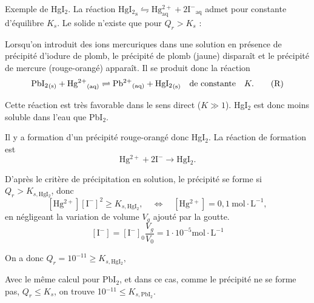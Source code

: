 \begin{solution}
\begin{questions}

\questioncours Exemple de HgI$_2$. La réaction $\mathrm{HgI_2}_\text{s} \leftrightharpoons \mathrm{Hg^{2+}_\text{aq} + 2 {I^-}_\text{aq}}$ admet pour constante d'équilibre $K_s$. Le solide n'existe que pour $Q_r > K_s$ :
    \begin{center}\end{center}

\question Lorsqu'on introduit des ions mercuriques dans une solution en présence de précipité d'iodure de plomb, le précipité de plomb (jaune) disparaît et le précipité de mercure (rouge-orangé) apparaît.
Il se produit donc la réaction
\begin{equation}
    \mathrm{{PbI_2}_\text{(s)} + {Hg^{2+}}_\text{(aq)} \rightleftharpoons {Pb^{2+}}_\text{(aq)} + {HgI_2}_\text{(s)}} \qqtext{de constante} K. \tag{R}
\end{equation}
    
Cette réaction est très favorable dans le sens direct ($K\gg 1$).
HgI$_2$ est donc moins soluble dans l'eau que PbI$_2$.


\question Il y a formation d'un précipité rouge-orangé donc HgI$_2$. La réaction de formation est
$$\mathrm{Hg^{2+} + 2I^- \rightarrow HgI_2}.$$

D'après le critère de précipitation en solution, le précipité se forme si $Q_r > K_{s,\mathrm{HgI_2}}$, donc $$\mathrm{[Hg^{2+}][I^-]^2}  \geqslant K_{s,\mathrm{HgI_2}}, \quad \Longleftrightarrow \quad \mathrm{[Hg^{2+}] = 0,1 \ mol\cdot L^{-1}},$$
en négligeant la variation de volume $V_g$ ajouté par la goutte.
$$\mathrm{[I^-]= [I^-]_0} \dfrac{V_g}{V_0} = \mathrm{1\cdot10^{-5} mol\cdot L^{-1}}$$

On a donc $Q_r = 10^{-11} \geqslant K_{s,\mathrm{HgI_2}},$

Avec le même calcul pour PbI$_2$, et dans ce cas, comme le précipité ne se forme pas, $Q_r \leqslant K_s$, on trouve 
10$^{-11} \leqslant K_{s,\mathrm{PbI_2}}$.


\end{questions}
\end{solution}
